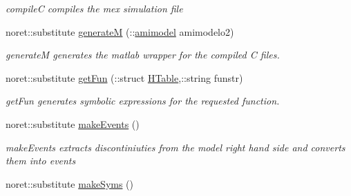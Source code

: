 \begin{DoxyCompactItemize}
\begin{DoxyCompactList}\small\item\em compile\+C compiles the mex simulation file \end{DoxyCompactList}\item 
noret\+::substitute \hyperlink{classamimodel_a6e93ea24824d9d90c322960e6d78fed0}{generate\+M} (\+::\hyperlink{classamimodel}{amimodel} amimodelo2)
\begin{DoxyCompactList}\small\item\em generate\+M generates the matlab wrapper for the compiled C files. \end{DoxyCompactList}\item 
noret\+::substitute \hyperlink{classamimodel_a08d58ae650e5ff9310760f6d3f08015c}{get\+Fun} (\+::struct \hyperlink{classamimodel_aafe6335df413dd688a2f44efba012cf1}{H\+Table},\+::string funstr)
\begin{DoxyCompactList}\small\item\em get\+Fun generates symbolic expressions for the requested function. \end{DoxyCompactList}\item 
\hypertarget{classamimodel_a4d4b20c81af6d7ed977b6b818c7b22db}{}noret\+::substitute \hyperlink{classamimodel_a4d4b20c81af6d7ed977b6b818c7b22db}{make\+Events} ()\label{classamimodel_a4d4b20c81af6d7ed977b6b818c7b22db}

\begin{DoxyCompactList}\small\item\em make\+Events extracts discontiniuties from the model right hand side and converts them into events \end{DoxyCompactList}\item 
\hypertarget{classamimodel_a5aba9155145df4b3f70bfec887c25af9}{}noret\+::substitute \hyperlink{classamimodel_a5aba9155145df4b3f70bfec887c25af9}{make\+Syms} ()\label{classamimodel_a5aba9155145df4b3f70bfec887c25af9}


\end{DoxyCompactItemize}

